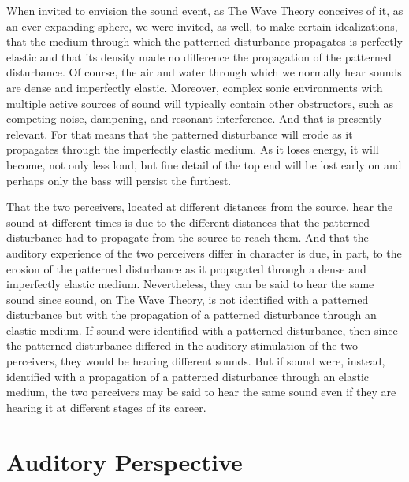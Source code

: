 When invited to envision the sound event, as The Wave Theory conceives of it, as an ever expanding sphere, we were invited, as well, to make certain idealizations, that the medium through which the patterned disturbance propagates is perfectly elastic and that its density made no difference the propagation of the patterned disturbance. Of course, the air and water through which we normally hear sounds are dense and imperfectly elastic. Moreover, complex sonic environments with multiple active sources of sound will typically contain other obstructors, such as competing noise, dampening, and resonant interference. And that is presently relevant. For that means that the patterned disturbance will erode as it propagates through the imperfectly elastic medium. As it loses energy, it will become, not only less loud, but fine detail of the top end will be lost early on and perhaps only the bass will persist the furthest. 

That the two perceivers, located at different distances from the source, hear the sound at different times is due to the different distances that the patterned disturbance had to propagate from the source to reach them. And that the auditory experience of the two perceivers differ in character is due, in part, to the erosion of the patterned disturbance as it propagated through a dense and imperfectly elastic medium. Nevertheless, they can be said to hear the same sound since sound, on The Wave Theory, is not identified with a patterned disturbance but with the propagation of a patterned disturbance through an elastic medium. If sound were identified with a patterned disturbance, then since the patterned disturbance differed in the auditory stimulation of the two perceivers, they would be hearing different sounds. But if sound were, instead, identified with a propagation of a patterned disturbance through an elastic medium, the two perceivers may be said to hear the same sound even if they are hearing it at different stages of its career.


\section{Auditory Perspective} %
\label{sec:auditory_perspective}

